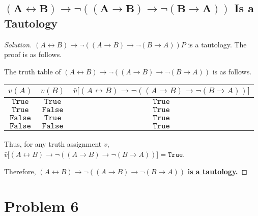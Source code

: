 \documentclass{article}
\newenvironment{solution}{\begin{proof}[\noindent\it Solution]}{\end{proof}}
\begin{document}
\subsection{$\boldsymbol{(A\leftrightarrow B)\to\neg((A\to B)\to\neg(B\to A))}$ Is a Tautology}
\vspace{1em}
\begin{solution}
    $(A\leftrightarrow B)\to\neg((A\to B)\to\neg(B\to A))P$ is a tautology. The proof is as follows.

    \hspace{2.6em}
    The truth table of $(A\leftrightarrow B)\to\neg((A\to B)\to\neg(B\to A))$ is as follows.

    \begin{table}[htbp]
        \centering
        \begin{tabular}{cc|c}
            \hline
            $v(A)$ & $v(B)$ & $\bar{v}\big[(A\leftrightarrow B)\to\neg((A\to B)\to\neg(B\to A))\big]$\\
            \hline
            $\mathtt{True}$ & $\mathtt{True}$ & $\mathtt{True}$\\
            $\mathtt{True}$ & $\mathtt{False}$ & $\mathtt{True}$\\
            $\mathtt{False}$ & $\mathtt{True}$ & $\mathtt{True}$\\
            $\mathtt{False}$ & $\mathtt{False}$ & $\mathtt{True}$\\
            \hline
        \end{tabular}
    \end{table}

    \hspace{2.6em}
    Thus, for any truth assignment $v$, $\bar{v}\big[(A\leftrightarrow B)\to\neg((A\to B)\to\neg(B\to A))\big]=\mathtt{True}$.

    \hspace{2.6em}
    Therefore, $(A\leftrightarrow B)\to\neg((A\to B)\to\neg(B\to A))$ \underline{\textbf{is a tautology.}}
\end{solution}

\vspace{3em}
\section{Problem 6}
\vspace{1em}
\end{document}
